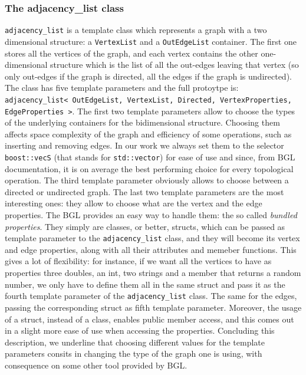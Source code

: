 \documentclass[11pt]{article} %
\newcommand{\classname}[1]{\texttt{#1}}
\begin{document}
		\subsubsection{The adjacency\_list class}
		\classname{adjacency\_list} is a template class which represents a graph with a two dimensional structure: 
		a \texttt{VertexList} and a \texttt{OutEdgeList} container. The first one stores all the vertices of the graph, and each vertex contains the other one-dimensional structure which is the list of all the out-edges leaving that vertex (so only out-edges if the graph is directed, all the edges if the graph is undirected). \newline
		The class has five template parameters and the full protoytpe is: \classname{adjacency\_list< OutEdgeList, VertexList, Directed, VertexProperties, EdgeProperties >}. \newline
		The first two template parameters allow to choose the types of the underlying containers for the bidimensional structure. Choosing them affects space complexity of the graph and efficiency of some operations, such as inserting and removing edges. In our work we always set them to the selector \classname{boost::vecS} (that stands for \texttt{std::vector}) for ease of use and since, from BGL documentation, it is on average the best performing choice for every topological operation. \newline
		The third template parameter obviously allows to choose between a directed or undirected graph.\newline
		The last two template parameters are the most interesting ones: they allow to choose what are the vertex and the edge properties. The BGL provides an easy way to handle them: the so called \textit{bundled properties}. They simply are classes, or better, structs, which can be passed as template parameter to the \classname{adjacency\_list} class, and they will become its vertex and edge properties, along with all their attributes and memeber functions. This gives a lot of flexibility: for instance, if we want all the vertices to have as properties three doubles, an int, two strings and a member that returns a random number, we only have to define them all in the same struct and pass it as the fourth template parameter of the \classname{adjacency\_list} class. The same for the edges, passing the corresponding struct as fifth template parameter. Moreover, the usage of a struct, instead of a class, enables public member access, and this comes out in a slight more ease of use when accessing the properties. \newline
		Concluding this description, we underline that choosing different values for the template parameters consits in changing the type of the graph one is using, with consequence on some other tool provided by BGL.
		
\end{document}
